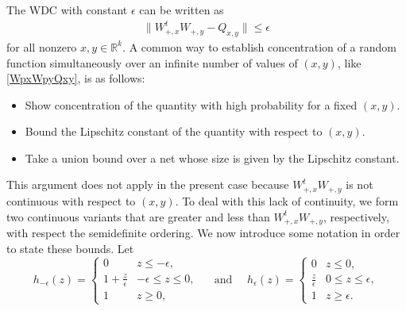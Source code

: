\documentclass[11pt]{article}
\newcommand{\R}{\mathbb{R}}
\newcommand{\eps}{\epsilon}
\newcommand{\calN}{\mathcal{N}}
\newcommand{\tran}{t}
\newcommand{\Aplus}[1]{A_{+, #1}}
\newcommand{\Wplus}[1]{W_{+, #1}}
\newcommand{\Apx}{\Aplus{x}}
\newcommand{\Wpx}{\Wplus{x}}
\newcommand{\Wpy}{\Wplus{y}}
\newcommand{\Apy}{\Aplus{y}}
\newcommand{\Apxt}{\Apx^\tran}
\newcommand{\hmeps}{h_{-\eps}}
\newcommand{\heps}{h_{\eps}}
\newcommand{\E}{\mathbb{E}}
\newcommand{\Mxyhat}{M_{\hat{x} \leftrightarrow \hat{y}}}
\newcommand{\xhat}{\hat{x}}
\newcommand{\yhat}{\hat{y}}
\newcommand{\Qxy}{Q_{x,y}}
\DeclareMathOperator{\Span}{span}
\DeclareMathOperator{\diag}{diag}
\begin{document}
The WDC with constant $\eps$ can be written as
\begin{align}
\| \Wpx^t\Wpy  - \Qxy \| \leq \eps  \label{WpxWpyQxy}
\end{align}
for all nonzero $x,y \in \R^k$. 
 A common way to establish concentration of a random function simultaneously over an infinite number of values of $(x,y)$, like \eqref{WpxWpyQxy}, is as follows:
\begin{itemize}
\item Show concentration of the quantity with high probability for a fixed $(x,y)$.
\item Bound the Lipschitz constant of the quantity with respect to $(x,y)$.
\item Take a union bound over a net whose size is given by the Lipschitz constant.
\end{itemize}
This argument does not apply in the present case because $\Wpx^t\Wpy$ is not continuous with respect to $(x,y)$.  To deal with this lack of continuity, we form two continuous variants that are greater and less than $\Wpx^t\Wpy$, respectively, with respect the semidefinite ordering.  
We now introduce some notation in order to state these bounds.  
Let 
\[
\hmeps(z) = \begin{cases}0 & z \leq -\eps, \\ 1 + \frac{z}{\eps} & -\eps \leq z \leq 0, \\ 1 & z\geq 0,  \end{cases} \quad \text{ and } \quad 
\heps(z) = \begin{cases}0 & z \leq 0, \\  \frac{z}{\eps} & 0 \leq z \leq \eps, \\ 1 & z\geq \eps.  \end{cases}
\]
\end{document}
